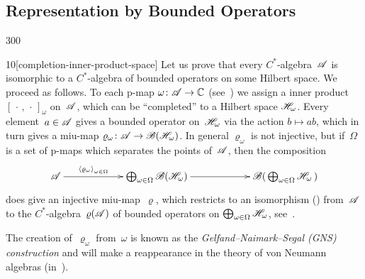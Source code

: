 \subsection{Representation by Bounded Operators}
\begin{parsec}{300}%
\begin{point}{10}[completion-inner-product-space]%
Let us prove that every $C^*$-algebra~$\mathscr{A}$
is isomorphic
to a $C^*$-algebra
of bounded operators on some Hilbert space.
We proceed as follows.
To each p-map $\omega\colon \mathscr{A}\to\mathbb{C}$
(see~)
we assign a inner product $[\,\cdot\,,\,\cdot\,]_\omega$ on~$\mathscr{A}$,
which can be ``completed'' to a Hilbert space $\mathscr{H}_\omega$.
Every element~$a\in \mathscr{A}$ gives a bounded operator on~$\mathscr{H}_\omega$
via the action $b\mapsto ab$, which in turn gives a 
miu-map $\varrho_\omega\colon \mathscr{A}\to \mathscr{B} (\mathscr{H}_\omega)$.
In general $\varrho_\omega$ is not injective,
but if~$\Omega$ is a set of p-maps which separates the
points of~$\mathscr{A}$,
then the composition
\begin{equation*}
	\xymatrix@C=6em{
		\scrA\ar[r]^-{\left<\varrho_\omega\right>_{\omega\in \Omega}}
		&
		\bigoplus_{\omega\in\Omega} \scrB(\scrH_\omega)
		\ar[r]
		&
		\scrB(\,\bigoplus_{\omega\in\Omega}\scrH_\omega\,)
	}
\end{equation*}
does give an injective miu-map~$\varrho$,
which restricts to an isomorphism 
()
from~$\mathscr{A}$
to the $C^*$-algebra~$\varrho(\mathscr{A})$
of bounded operators
on $\bigoplus_{\omega\in \Omega} \mathscr{H}_\omega$,
see~.

The creation of~$\varrho_\omega$ from~$\omega$
is known as the \emph{Gelfand--Naimark--Segal (GNS) construction}
and will make a reappearance in the theory of von Neumann algebras
(in~).


\end{point}
\end{parsec}
